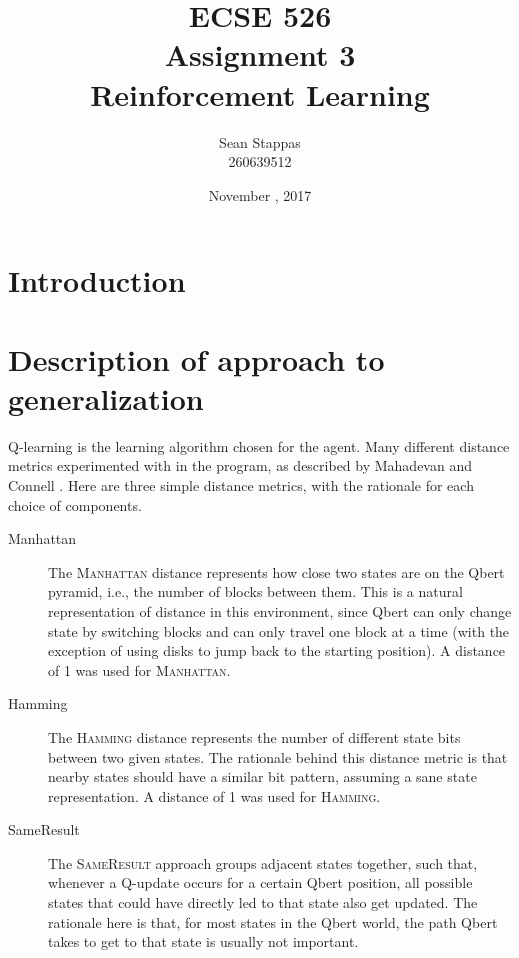 \documentclass[a4paper,titlepage]{article}
\title{
	\textbf{ECSE 526 \\ Assignment 3}
	\\ \large Reinforcement Learning
}
\author{Sean Stappas \\ 260639512}
\date{November \nth{7}, 2017}
\begin{document}
	\sloppy
	\maketitle
	\twocolumn
	
	\section*{Introduction}
	
	
	\section{Description of approach to generalization} \label{sec:generalization_description}
	
	Q-learning is the learning algorithm chosen for the agent. Many different distance metrics experimented with in the program, as described by Mahadevan and Connell \cite{mahadevan}. Here are three simple distance metrics, with the rationale for each choice of components.
	
	\begin{description}
		\item[Manhattan] The \textsc{Manhattan} distance represents how close two states are on the Qbert pyramid, i.e., the number of blocks between them. This is a natural representation of distance in this environment, since Qbert can only change state by switching blocks and can only travel one block at a time (with the exception of using disks to jump back to the starting position). A distance of 1 was used for \textsc{Manhattan}.
		
		\item[Hamming] The \textsc{Hamming} distance represents the number of different state bits between two given states. The rationale behind this distance metric is that nearby states should have a similar bit pattern, assuming a sane state representation. A distance of 1 was used for \textsc{Hamming}.
		
		\item[SameResult] The \textsc{SameResult} approach groups adjacent states together, such that, whenever a Q-update occurs for a certain Qbert position, all possible states that could have directly led to that state also get updated. The rationale here is that, for most states in the Qbert world, the path Qbert takes to get to that state is usually not important.
	\end{description}
	
\end{document}
